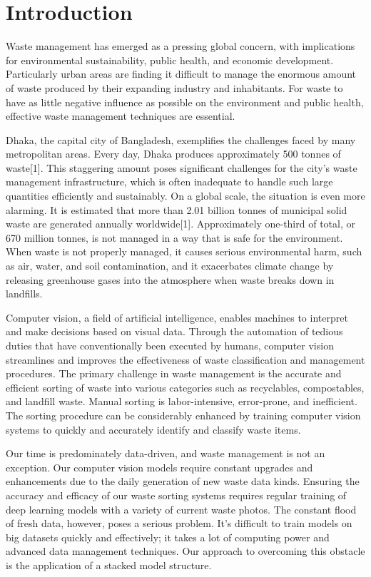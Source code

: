 
\chapter{Introduction}
Waste management has emerged as a pressing global concern, with implications for environmental sustainability, public health, and economic development. Particularly urban areas are finding it difficult to manage the enormous amount of waste produced by their expanding industry and inhabitants. For waste to have as little negative influence as possible on the environment and public health, effective waste management techniques are essential. 

Dhaka, the capital city of Bangladesh, exemplifies the challenges faced by many metropolitan areas. Every day, Dhaka produces approximately 500 tonnes of waste[1]. This staggering amount poses significant challenges for the city's waste management infrastructure, which is often inadequate to handle such large quantities efficiently and sustainably. On a global scale, the situation is even more alarming. It is estimated that more than 2.01 billion tonnes of municipal solid waste are generated annually worldwide[1]. Approximately one-third of total, or 670 million tonnes, is not managed in a way that is safe for the environment. When waste is not properly managed, it causes serious environmental harm, such as air, water, and soil contamination, and it exacerbates climate change by releasing greenhouse gases into the atmosphere when waste breaks down in landfills.

Computer vision, a field of artificial intelligence, enables machines to interpret and make decisions based on visual data. Through the automation of tedious duties that have conventionally been executed by humans, computer vision streamlines and improves the effectiveness of waste classification and management procedures. The primary challenge in waste management is the accurate and efficient sorting of waste into various categories such as recyclables, compostables, and landfill waste. Manual sorting is labor-intensive, error-prone, and inefficient. The sorting procedure can be considerably enhanced by training computer vision systems to quickly and accurately identify and classify waste items.

Our time is predominately data-driven, and waste management is not an exception. Our computer vision models require constant upgrades and enhancements due to the daily generation of new waste data kinds. Ensuring the accuracy and efficacy of our waste sorting systems requires regular training of deep learning models with a variety of current waste photos. The constant flood of fresh data, however, poses a serious problem. It's difficult to train models on big datasets quickly and effectively; it takes a lot of computing power and advanced data management techniques. Our approach to overcoming this obstacle is the application of a stacked model structure.


